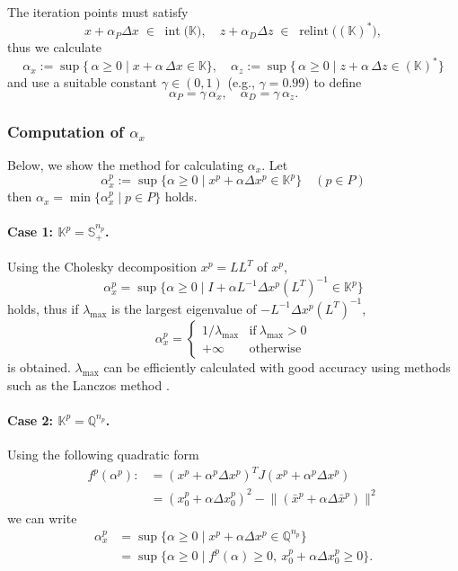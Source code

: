 The iteration points must satisfy
\[
  x + \alpha_P \Delta x \;\in\; \operatorname{int}\bigl(\mathbb{K}\bigr),
  \quad
  z + \alpha_D \Delta z \;\in\; \operatorname{relint}\bigl((\mathbb{K})^*\bigr),
\]
thus we calculate
\[
  \alpha_x  := \sup \bigl\{\,\alpha \ge 0 \mid x + \alpha \,\Delta x \in \mathbb{K}\bigr\},
  \quad
  \alpha_z  := \sup \bigl\{\,\alpha \ge 0 \mid z + \alpha \,\Delta z \in (\mathbb{K})^*\bigr\}
\]
and use a suitable constant $\gamma\in(0,1)$ (e.g., $\gamma=0.99$) to define
\[
  \alpha_P 
    = \gamma \,\alpha_x, 
  \quad
  \alpha_D 
    = \gamma \,\alpha_z.
\]

\subsubsection{Computation of $\alpha_x$}
Below, we show the method for calculating $\alpha_x$.  
Let \[\alpha^p_x:=\sup\{\alpha \geq 0 \mid x^p + \alpha \Delta x^p \in \mathbb{K}^p\} \quad (p\in P)\]
then $\alpha_x=\min\{\alpha^p_x\mid p\in P\}$ holds.

\paragraph{Case 1: $\mathbb{K}^p = \mathbb{S}^{n_p}_+$.}

Using the Cholesky decomposition $x^p=LL^T$ of $x^p$,
\[\alpha^p_x = \sup\{\alpha \geq 0 \mid I + \alpha L^{-1} \Delta x^p (L^T)^{-1} \in \mathbb{K}^p\}\]
holds, thus if $\lambda_{\max}$ is the largest eigenvalue of $-L^{-1} \Delta x^p (L^T)^{-1}$,
\[\alpha^p_x = \begin{cases}
    1/\lambda_{\max} & \text{if} ~ \lambda_{\max} > 0 \\
    +\infty & \text{otherwise}
\end{cases}\]
is obtained.
$\lambda_{\max}$ can be efficiently calculated with good accuracy using methods such as the Lanczos method \cite{Golub2013}.

\paragraph{Case 2: $\mathbb{K}^p = \mathbb{Q}^{n_p}$.}

Using the following quadratic form
\begin{align*}
  f^p(\alpha^p)
  :&= ( x^p + \alpha^p \Delta x^p )^T J ( x^p + \alpha^p \Delta x^p )\\
   &=  ( x^p_0 + \alpha \Delta x^p_0 )^2 - \bigl\|( \bar{x}^p + \alpha \Delta \bar{x}^p )\bigr\|^2
\end{align*}
we can write
\begin{align*}
    \alpha_x^p 
    &= \sup\{\alpha \geq 0 \mid x^p + \alpha \Delta x^p \in \mathbb{Q}^{n_p}\}\\
    &= \sup\{\alpha \geq 0 \mid f^p(\alpha) \geq 0, ~x^p_0 + \alpha \Delta x^p_0 \geq 0\}.
\end{align*}

